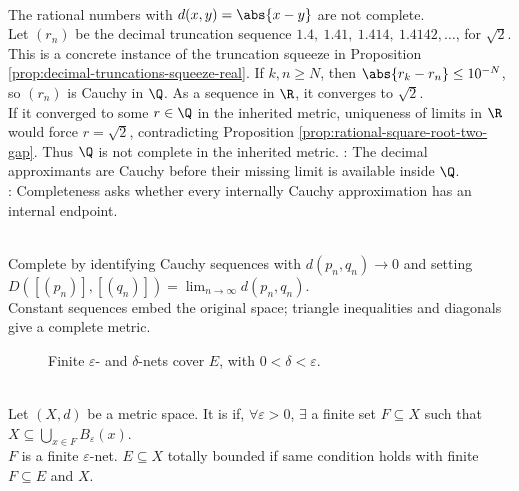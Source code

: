 \begin{example} \label{ex:rational-metric-not-complete} \\
The rational numbers with $d(x,y)=\abs{x-y}$ are not complete.\\
Let $(r_n)$ be the decimal truncation sequence $1.4,\ 1.41,\ 1.414,\ 1.4142,\ldots$, for $\sqrt{2}$.\\
This is a concrete instance of the truncation squeeze in Proposition \ref{prop:decimal-truncations-squeeze-real}. If $k,n\geq N$, then $\abs{r_k-r_n}\leq10^{-N}$, so $(r_n)$ is Cauchy in $\Q$. As a sequence in $\R$, it converges to $\sqrt{2}$.\\
If it converged to some $r\in\Q$ in the inherited metric, uniqueness of limits in $\R$ would force $r=\sqrt{2}$, contradicting Proposition \ref{prop:rational-square-root-two-gap}. Thus $\Q$ is not complete in the inherited metric.
: The decimal approximants are Cauchy before their missing limit is available inside $\Q$.\\
: Completeness asks whether every internally Cauchy approximation has an internal endpoint.
\end{example}

\begin{perspective} \label{per:cauchy-completion-skeleton} \\
Complete by identifying Cauchy sequences with $d(p_n,q_n)\to0$ and setting $D([(p_n)],[(q_n)])=\lim_{n\to\infty}d(p_n,q_n)$.\\
Constant sequences embed the original space; triangle inequalities and diagonals give a complete metric.
\end{perspective}


\begin{figure}[H]
  \centering
  
  \caption{Finite $\varepsilon$- and $\delta$-nets cover $E$, with $0<\delta<\varepsilon$.}
  \label{fig:total-boundedness-finite-cover}
\end{figure}

\begin{definition} \label{def:totally-bounded-metric-space} \\
Let $(X,d)$ be a metric space. It is  if, $\forall \varepsilon>0$, $\exists$ a finite set $F\subseteq X$ such that $X\subseteq\bigcup\limits_{x\in F}B_\varepsilon(x)$.\\
$F$ is a finite $\varepsilon$-net. $E\subseteq X$ totally bounded if same condition holds with finite $F\subseteq E$ and $X$.
\end{definition}

